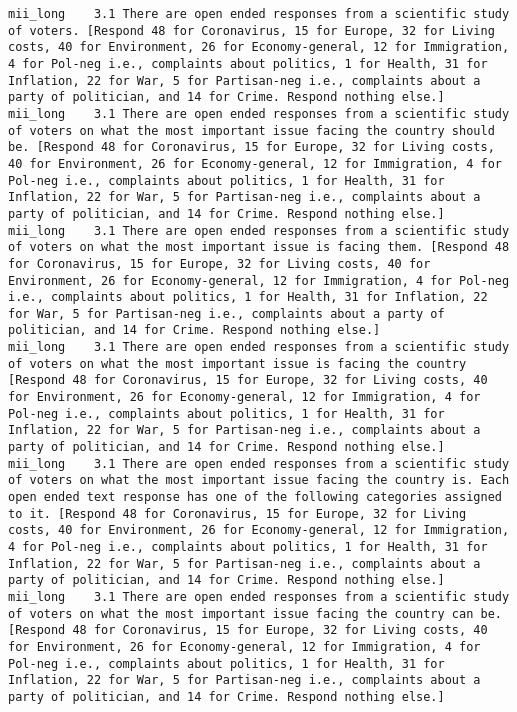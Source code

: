 \begin{lstlisting}[label=lst:promptvariants]
mii_long	3.1	There are open ended responses from a scientific study of voters. [Respond 48 for Coronavirus, 15 for Europe, 32 for Living costs, 40 for Environment, 26 for Economy-general, 12 for Immigration, 4 for Pol-neg i.e., complaints about politics, 1 for Health, 31 for Inflation, 22 for War, 5 for Partisan-neg i.e., complaints about a party of politician, and 14 for Crime. Respond nothing else.]
mii_long	3.1	There are open ended responses from a scientific study of voters on what the most important issue facing the country should be. [Respond 48 for Coronavirus, 15 for Europe, 32 for Living costs, 40 for Environment, 26 for Economy-general, 12 for Immigration, 4 for Pol-neg i.e., complaints about politics, 1 for Health, 31 for Inflation, 22 for War, 5 for Partisan-neg i.e., complaints about a party of politician, and 14 for Crime. Respond nothing else.]
mii_long	3.1	There are open ended responses from a scientific study of voters on what the most important issue is facing them. [Respond 48 for Coronavirus, 15 for Europe, 32 for Living costs, 40 for Environment, 26 for Economy-general, 12 for Immigration, 4 for Pol-neg i.e., complaints about politics, 1 for Health, 31 for Inflation, 22 for War, 5 for Partisan-neg i.e., complaints about a party of politician, and 14 for Crime. Respond nothing else.]
mii_long	3.1	There are open ended responses from a scientific study of voters on what the most important issue is facing the country [Respond 48 for Coronavirus, 15 for Europe, 32 for Living costs, 40 for Environment, 26 for Economy-general, 12 for Immigration, 4 for Pol-neg i.e., complaints about politics, 1 for Health, 31 for Inflation, 22 for War, 5 for Partisan-neg i.e., complaints about a party of politician, and 14 for Crime. Respond nothing else.]
mii_long	3.1	There are open ended responses from a scientific study of voters on what the most important issue facing the country is. Each open ended text response has one of the following categories assigned to it. [Respond 48 for Coronavirus, 15 for Europe, 32 for Living costs, 40 for Environment, 26 for Economy-general, 12 for Immigration, 4 for Pol-neg i.e., complaints about politics, 1 for Health, 31 for Inflation, 22 for War, 5 for Partisan-neg i.e., complaints about a party of politician, and 14 for Crime. Respond nothing else.]
mii_long	3.1	There are open ended responses from a scientific study of voters on what the most important issue facing the country can be. [Respond 48 for Coronavirus, 15 for Europe, 32 for Living costs, 40 for Environment, 26 for Economy-general, 12 for Immigration, 4 for Pol-neg i.e., complaints about politics, 1 for Health, 31 for Inflation, 22 for War, 5 for Partisan-neg i.e., complaints about a party of politician, and 14 for Crime. Respond nothing else.]

\end{lstlisting}
